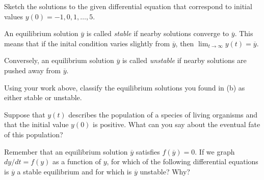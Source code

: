 \begin{activity}
\item  Sketch the solutions to the given differential equation that correspond to initial values $y(0)=-1, 0, 1, \ldots, 5$.

\item  An equilibrium solution $\overline{y}$ is called {\em stable}  
  if nearby 
  solutions converge to $\overline{y}$.  This means that if the inital
  condition varies slightly from $\overline{y}$, then
  $\lim_{t\to\infty}y(t) = \overline{y}$.  

  Conversely, an equilibrium solution $\overline{y}$ 
  is called {\em unstable}   if nearby solutions are pushed away from
  $\overline{y}$.

  Using your work above, classify the equilibrium solutions you found in (b)
  as either stable or unstable.

\item Suppose that $y(t)$ describes the population of a species of
  living organisms and that the initial value $y(0)$ is positive.  What can you
  say about the eventual fate of this population?  

\item  Remember that an equilibrium solution $\overline{y}$ satisfies
  $f(\overline{y}) = 0$.  If we graph $dy/dt = f(y)$ as a function of
  $y$, for which of the following differential equations is
  $\overline{y}$ a stable equilibrium and for which is $\overline{y}$ unstable?  Why?


\end{activity}
